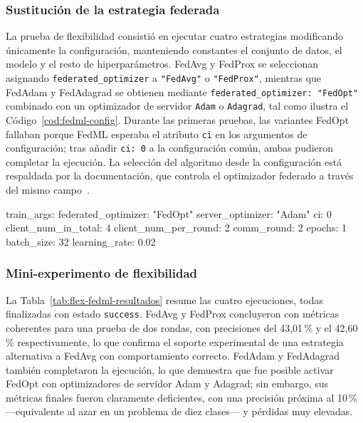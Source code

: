 \subsubsection{Sustitución de la estrategia federada}\label{subsec:flex-fedml-strategy}

La prueba de flexibilidad consistió en ejecutar cuatro estrategias modificando
únicamente la configuración, manteniendo constantes el conjunto de datos, el
modelo y el resto de hiperparámetros. FedAvg y FedProx se seleccionan asignando
\texttt{federated\_\allowbreak optimizer} a \texttt{"FedAvg"} o \texttt{"FedProx"}, mientras que
FedAdam y FedAdagrad se obtienen mediante \texttt{federated\_\allowbreak optimizer:\ "FedOpt"}
combinado con un optimizador de servidor \texttt{Adam} o \texttt{Adagrad}, tal como
ilustra el Código~\ref{cod:fedml-config}. Durante las primeras pruebas, las
variantes FedOpt fallaban porque FedML esperaba el atributo \texttt{ci} en los
argumentos de configuración; tras añadir \texttt{ci:\ 0} a la configuración común,
ambas pudieron completar la ejecución. La selección del algoritmo desde la
configuración está respaldada por la documentación, que controla el optimizador
federado a través del mismo campo~\parencite{fedmlSimApi}.

\begin{yamlcode}[title={Fragmento de fedml\_config.yaml (FedAdam vía FedOpt)}, label={cod:fedml-config}, list entry={\protect\numberline{\thelisting}Configuración FedAdam vía FedOpt en FedML (fedml\_config.yaml)}]
train_args:
  federated_optimizer: "FedOpt"
  server_optimizer: "Adam"
  ci: 0
  client_num_in_total: 4
  client_num_per_round: 2
  comm_round: 2
  epochs: 1
  batch_size: 32
  learning_rate: 0.02
\end{yamlcode}

\subsubsection{Mini-experimento de flexibilidad}\label{subsec:flex-fedml-mini}

La Tabla~\ref{tab:flex-fedml-resultados} resume las cuatro ejecuciones, todas
finalizadas con estado \texttt{success}. FedAvg y FedProx concluyeron con métricas
coherentes para una prueba de dos rondas, con precisiones del 43,01\,\% y el
42,60\,\% respectivamente, lo que confirma el soporte experimental de una estrategia
alternativa a FedAvg con comportamiento correcto. FedAdam y FedAdagrad también
completaron la ejecución, lo que demuestra que fue posible activar FedOpt con
optimizadores de servidor Adam y Adagrad; sin embargo, sus métricas finales fueron
claramente deficientes, con una precisión próxima al 10\,\% —equivalente al azar en
un problema de diez clases— y pérdidas muy elevadas.

